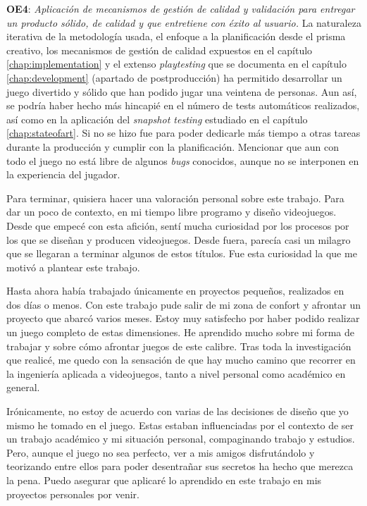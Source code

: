 \textbf{OE4}: \textit{Aplicación de mecanismos de gestión de calidad y validación para entregar un producto sólido, de calidad y que entretiene con éxito al usuario.} La naturaleza iterativa de la metodología usada, el enfoque a la planificación desde el prisma creativo, los mecanismos de gestión de calidad expuestos en el capítulo \ref{chap:implementation} y el extenso \textit{playtesting} que se documenta en el capítulo \ref{chap:development} (apartado de postproducción) ha permitido desarrollar un juego divertido y sólido que han podido jugar una veintena de personas. Aun así, se podría haber hecho más hincapié en el número de tests automáticos realizados, así como en la aplicación del \textit{snapshot testing} estudiado en el capítulo \ref{chap:stateofart}. Si no se hizo fue para poder dedicarle más tiempo a otras tareas durante la producción y cumplir con la planificación. Mencionar que aun con todo el juego no está libre de algunos \textit{bugs} conocidos, aunque no se interponen en la experiencia del jugador.

Para terminar, quisiera hacer una valoración personal sobre este trabajo. Para dar un poco de contexto, en mi tiempo libre programo y diseño videojuegos. Desde que empecé con esta afición, sentí mucha curiosidad por los procesos por los que se diseñan y producen videojuegos. Desde fuera, parecía casi un milagro que se llegaran a terminar algunos de estos títulos. Fue esta curiosidad la que me motivó a plantear este trabajo.

Hasta ahora había trabajado únicamente en proyectos pequeños, realizados en dos días o menos. Con este trabajo pude salir de mi zona de confort y afrontar un proyecto que abarcó varios meses. Estoy muy satisfecho por haber podido realizar un juego completo de estas dimensiones. He aprendido mucho sobre mi forma de trabajar y sobre cómo afrontar juegos de este calibre. Tras toda la investigación que realicé, me quedo con la sensación de que hay mucho camino que recorrer en la ingeniería aplicada a videojuegos, tanto a nivel personal como académico en general.

Irónicamente, no estoy de acuerdo con varias de las decisiones de diseño que yo mismo he tomado en el juego. Estas estaban influenciadas por el contexto de ser un trabajo académico y mi situación personal, compaginando trabajo y estudios. Pero, aunque el juego no sea perfecto, ver a mis amigos disfrutándolo y teorizando entre ellos para poder desentrañar sus secretos ha hecho que merezca la pena. Puedo asegurar que aplicaré lo aprendido en este trabajo en mis proyectos personales por venir.

